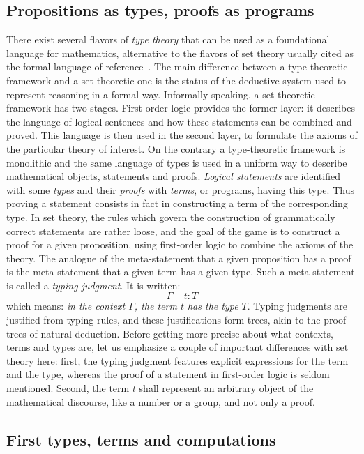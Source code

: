 \subsection{Propositions as types, proofs as programs}
There exist several flavors of \emph{type theory} that can be used
as a foundational language for mathematics, alternative to the
flavors of set theory usually cited as the formal language of
reference~\cite{bourbaki-sets}.
The main difference between a type-theoretic framework and
a set-theoretic one is the status of the deductive system used to
represent reasoning in a formal way. Informally speaking, a
set-theoretic framework has two stages. First order logic provides
the former layer: it describes the language of logical sentences and how
these statements can be combined and proved. This language is then
used in the second layer, to formulate the axioms of the particular
theory of interest.
On the contrary a type-theoretic framework is monolithic and the
same language of types is used in a uniform way to describe
mathematical objects, statements and proofs. \emph{Logical statements}
are identified with some \emph{types} and their \emph{proofs} with
\emph{terms}, or programs, having this type. Thus proving a statement
consists in fact in constructing a term of the corresponding type. In
set theory, the rules which govern the construction of
grammatically correct statements are rather loose, and the goal of the
game is to construct a proof for a given proposition, using
first-order logic to combine the axioms of the theory.
The analogue of the meta-statement that a given
proposition has a proof is the meta-statement that a given term has a
given type. Such a meta-statement is called a \emph{typing
  judgment}. It is written:
$$\Gamma \vdash t : T$$
which means:
\emph{in the context $\Gamma$, the term $t$ has the type $T$}.
Typing judgments are justified from typing rules, and these
justifications form trees, akin to the proof trees of natural deduction.
Before getting more precise about what contexts, terms and types are,
let us emphasize a couple of important differences with set theory
here: first, the typing judgment features explicit expressions for
the term and the type, whereas the proof of a statement in first-order
logic is seldom mentioned. Second, the term $t$ shall represent an
arbitrary object of the mathematical discourse, like a number or a
group, and not only a proof.


\subsection{First types, terms and computations}\label{ssec:terms}


